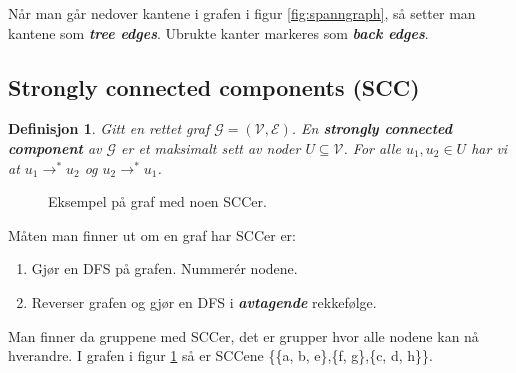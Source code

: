 \documentclass[11pt,a4paper]{article}
\theoremstyle{def}
\begin{document}
Når man går nedover kantene i grafen i figur \ref{fig:spanngraph}, så setter man kantene som \textit{\textbf{tree edges}}. Ubrukte kanter markeres som \textit{\textbf{back edges}}.

\newpage

\subsection{Strongly connected components (SCC)}
\theoremstyle{mytheoremstyle}
\newtheorem{scc}{Definisjon}[subsection]
\begin{scc}
Gitt en rettet graf $\mathcal{G} = (\mathcal{V}, \mathcal{E})$. En \textbf{strongly connected component} av $\mathcal{G}$ er et maksimalt sett av noder $U \subseteq \mathcal{V}$. For alle $u_1, u_2 \in U$ har vi at $u_1 \rightarrow^*u_2$ og $u_2\rightarrow^*u_1$.
\end{scc}

\begin{figure}[h!]
\centering
{}
\caption{Eksempel på graf med noen SCCer.}
\label{fig:scc}
\end{figure}

Måten man finner ut om en graf har SCCer er:
\begin{enumerate}
\vspace{-15pt}
\item
Gjør en DFS på grafen. Nummerér nodene.
\item
Reverser grafen og gjør en DFS i \textit{\textbf{avtagende}} rekkefølge.
\vspace{-15pt}
\end{enumerate}
Man finner da gruppene med SCCer, det er grupper hvor alle nodene kan nå hverandre. I grafen i figur \ref{fig:scc} så er SCCene \{\{a, b, e\},\{f, g\},\{c, d, h\}\}.
\end{document}
